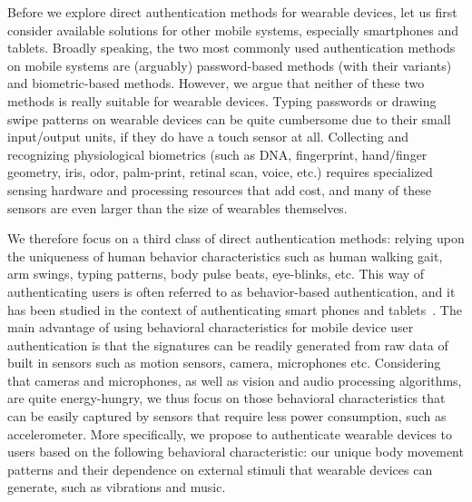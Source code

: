 Before we explore direct authentication methods for wearable devices, let us
first consider available solutions for other mobile systems, especially
smartphones and tablets. Broadly speaking, the two most commonly used
authentication methods on mobile systems are (arguably) password-based methods
(with their variants) and biometric-based methods. However, we argue that
neither of these two methods is really suitable for wearable devices. Typing
passwords or drawing swipe patterns on wearable devices can be quite
cumbersome due to their small input/output units, if they do have a touch
sensor at all. Collecting and recognizing physiological biometrics (such as
DNA, fingerprint, hand/finger geometry, iris, odor, palm-print, retinal scan,
voice, etc.) requires specialized sensing hardware and processing resources
that add cost, and many of these sensors are even larger than the size of wearables
themselves.

We therefore focus on a third class of direct authentication methods: relying upon the uniqueness of human behavior characteristics such as human walking gait, arm swings, typing patterns, body pulse beats, eye-blinks, etc. This way of authenticating users is often referred to as behavior-based authentication, and it has been studied in the context of authenticating smart phones and tablets~\cite{rahman2014bodybeat,cornelius2014wearable,stevenage1999visual,okumura2006study,monrose2000keystroke,jorgensen2011mouse,bo2013silentsense,de2012touch}. The main advantage of using behavioral characteristics for mobile device user authentication is that the signatures can be readily generated from raw data of built in sensors such as motion sensors, camera, microphones etc. Considering that cameras and microphones, as well as vision and audio processing algorithms, are quite energy-hungry, we thus focus on those behavioral characteristics that can be easily captured by sensors that require less power consumption, such as accelerometer. More specifically, we propose to authenticate wearable devices to users based on the following behavioral characteristic: our unique body movement patterns and their dependence on external stimuli that wearable devices can generate, such as vibrations and music.

